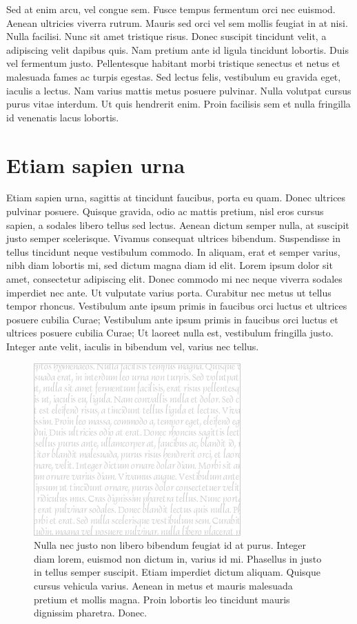 Sed at enim arcu, vel congue sem.
Fusce tempus fermentum orci nec euismod.
Aenean ultricies viverra rutrum.
Mauris sed orci vel sem mollis feugiat in at nisi.
Nulla facilisi.
Nunc sit amet tristique risus.
Donec suscipit tincidunt velit, a adipiscing velit dapibus quis.
Nam pretium ante id ligula tincidunt lobortis.
Duis vel fermentum justo.
Pellentesque habitant morbi tristique senectus et netus et malesuada fames ac turpis egestas.
Sed lectus felis, vestibulum eu gravida eget, iaculis a lectus.
Nam varius mattis metus posuere pulvinar.
Nulla volutpat cursus purus vitae interdum.
Ut quis hendrerit enim.
Proin facilisis sem et nulla fringilla id venenatis lacus lobortis.

\section{Etiam sapien urna}
Etiam sapien urna, sagittis at tincidunt faucibus, porta eu quam.
Donec ultrices pulvinar posuere.
Quisque gravida, odio ac mattis pretium, nisl eros cursus sapien, a sodales libero tellus sed lectus.
Aenean dictum semper nulla, at suscipit justo semper scelerisque.
Vivamus consequat ultrices bibendum.
Suspendisse in tellus tincidunt neque vestibulum commodo.
In aliquam, erat et semper varius, nibh diam lobortis mi, sed dictum magna diam id elit.
Lorem ipsum dolor sit amet, consectetur adipiscing elit.
Donec commodo mi nec neque viverra sodales imperdiet nec ante.
Ut vulputate varius porta.
Curabitur nec metus ut tellus tempor rhoncus.
Vestibulum ante ipsum primis in faucibus orci luctus et ultrices posuere cubilia Curae; Vestibulum ante ipsum primis in faucibus orci luctus et ultrices posuere cubilia Curae; Ut laoreet nulla est, vestibulum fringilla justo.
Integer ante velit, iaculis in bibendum vel, varius nec tellus.

\begin{figure}[t]
  \centering
  \includegraphics{figs/medium-rectangle-white}
  \caption[Nulla nec justo]{
    Nulla nec justo non libero bibendum feugiat id at purus.
Integer diam lorem, euismod non dictum in, varius id mi.
Phasellus in justo in tellus semper suscipit.
Etiam imperdiet dictum aliquam.
Quisque cursus vehicula varius.
Aenean in metus et mauris malesuada pretium et mollis magna.
Proin lobortis leo tincidunt mauris dignissim pharetra.
Donec.
  }
\end{figure}

